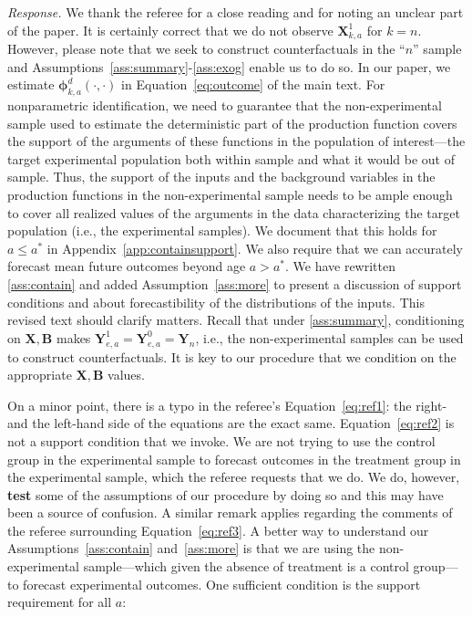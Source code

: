 \noindent \textit{Response.} We thank the referee for a close reading and for noting an unclear part of the paper. It is certainly correct that we do not observe $\bm{X}_{k,a}^1$ for $k = n$. However, please note that we seek to construct counterfactuals in the ``$n$'' sample and Assumptions~\ref{ass:summary}-\ref{ass:exog} enable us to do so. In our paper, we estimate $\bm{\phi}_{k,a}^d \left( \cdot, \cdot \right)$ in Equation~\eqref{eq:outcome} of the main text. For nonparametric identification, we need to guarantee that the non-experimental sample used to estimate the deterministic part of the production function covers the support of the arguments of these functions in the population of interest---the target experimental population both within sample and what it would be out of sample. Thus, the support of the inputs and the background variables in the production functions in the non-experimental sample needs to be ample enough to cover all realized values of the arguments in the data characterizing the target population (i.e., the experimental samples). We document that this holds for $a \leq a^*$ in Appendix~\ref{app:containsupport}. We also require that we can accurately forecast mean future outcomes beyond age $a > a^*$. We have rewritten \ref{ass:contain} and added Assumption~\ref{ass:more} to present a discussion of support conditions and about forecastibility of the distributions of the inputs. This revised text should clarify matters. Recall that under \ref{ass:summary}, conditioning on $\bm{X}, \bm{B}$ makes $\bm{Y}^1_{e,a} = \bm{Y}^0_{e,a} = \bm{Y}_n$, i.e., the non-experimental samples can be used to construct counterfactuals. It is key to our procedure that we condition on the appropriate $\bm{X},\bm{B}$ values.

On a minor point, there is a typo in the referee's Equation~\eqref{eq:ref1}: the right- and the left-hand side of the equations are the exact same. Equation~\eqref{eq:ref2} is not a support condition that we invoke. We are not trying to use the control group in the experimental sample to forecast outcomes in the treatment group in the experimental sample, which the referee requests that we do. We do, however, \textbf{test} some of the assumptions of our procedure by doing so and this may have been a source of confusion. A similar remark applies regarding the comments of the referee surrounding Equation~\eqref{eq:ref3}. A better way to understand our Assumptions~\ref{ass:contain} and~\ref{ass:more} is that we are using the non-experimental sample---which given the absence of treatment is a control group---to forecast experimental outcomes. One sufficient condition is the support requirement for all $a$:

